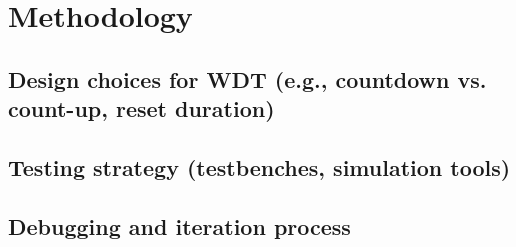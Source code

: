 

\chapter{Methodology}
\label{chap:methodology}

\section{Design choices for WDT (e.g., countdown vs. count-up, reset duration)}

\section{Testing strategy (testbenches, simulation tools)}

\section{Debugging and iteration process}